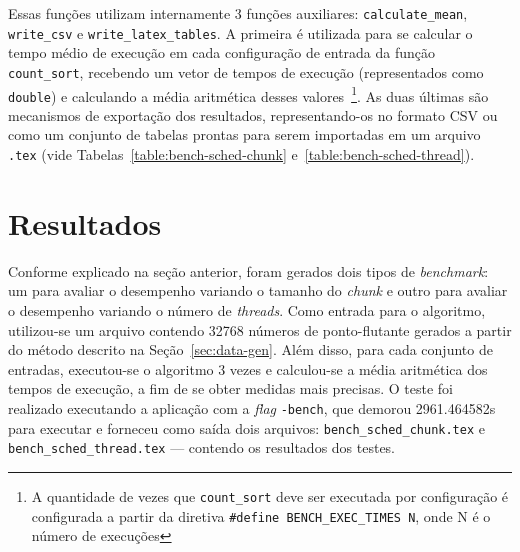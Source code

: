 \documentclass[12pt,a4paper]{article}
\begin{document}
Essas funções utilizam internamente 3 funções auxiliares:
\texttt{calculate\_mean}, \texttt{write\_csv} e \texttt{write\_latex\_tables}. A
primeira é utilizada para se calcular o tempo médio de execução em cada
configuração de entrada da função \texttt{count\_sort}, recebendo um vetor de
tempos de execução (representados como \texttt{double}) e calculando a média
aritmética desses valores~\footnote{A quantidade de vezes que
\texttt{count\_sort} deve ser executada por configuração é configurada a partir
da diretiva \texttt{\#define BENCH\_EXEC\_TIMES N}, onde N é o número de
execuções}. As duas últimas são mecanismos de exportação dos resultados,
representando-os no formato CSV ou como um conjunto de tabelas prontas para
serem importadas em um arquivo \texttt{.tex} (vide
Tabelas~\ref{table:bench-sched-chunk} e~\ref{table:bench-sched-thread}).
 
\section{Resultados}
Conforme explicado na seção anterior, foram gerados dois tipos de
\textit{benchmark}: um para avaliar o desempenho variando o tamanho do
\textit{chunk} e outro para avaliar o desempenho variando o número de
\textit{threads}. Como entrada para o algoritmo, utilizou-se um arquivo contendo
32768 números de ponto-flutante gerados a partir do método descrito na
Seção~\ref{sec:data-gen}. Além disso, para cada conjunto de entradas,
executou-se o algoritmo 3 vezes e calculou-se a média aritmética dos tempos de
execução, a fim de se obter medidas mais precisas. O teste foi realizado
executando a aplicação com a \textit{flag} \texttt{-bench}, que demorou
2961.464582s para executar e forneceu como saída dois arquivos:
\texttt{bench\_sched\_chunk.tex} e \texttt{bench\_sched\_thread.tex} ---
contendo os resultados dos testes.
\end{document}
